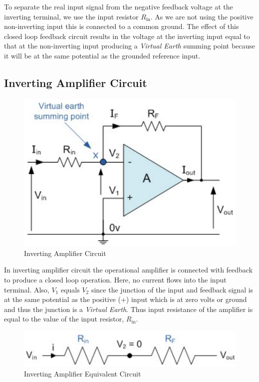 To separate the real input signal from the negative feedback voltage at the inverting terminal, we use the input resistor $R_\text{in}$. As we are not using the positive non-inverting input this is connected to a common ground.
The effect of this closed loop feedback circuit results in the voltage at the inverting input equal to that at the non-inverting input producing a \textit{Virtual Earth} summing point because it will be at the same potential as the grounded reference input. 

\subsection{Inverting Amplifier Circuit}

\begin{figure}[H]
    \centering
    \includegraphics[width=0.7\columnwidth]{images/inv1.png}
    \caption{Inverting Amplifier Circuit}
    \label{inv1}
\end{figure}

In inverting amplifier circuit the operational amplifier is connected with feedback to produce a closed loop operation. Here, no current flows into the input terminal. Also, $V_1$ equals $V_2$ since the junction of the input and feedback signal is at the same potential as the positive (+) input which is at zero volts or ground and thus the junction is a \textit{Virtual Earth}. Thus input resistance of the amplifier is equal to the value of the input resistor, $R_\text{in}$.

\begin{figure}[H]
    \centering
    \includegraphics[width=0.8\columnwidth]{images/inv2.png}
    \caption{Inverting Amplifier Equivalent Circuit}
    \label{inv2}
\end{figure}

